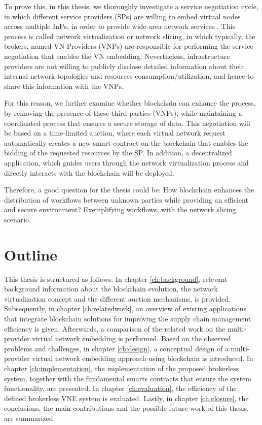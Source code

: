 To prove this, in this thesis, we thoroughly investigate a service negotiation cycle, in which different service providers (SPs) are willing to embed virtual nodes across multiple InPs, in order to provide wide-area network services \cite{dietrich2015multi}. This process is called network virtualization or network slicing, in which typically, the brokers, named VN Providers (VNPs) are responsible for performing the service negotiation that enables the VN embedding. Nevertheless, infrastructure providers are not willing to publicly disclose detailed information about their internal network topologies and resources consumption/utilization, and hence to share this information with the VNPs.

For this reason, we further examine whether blockchain can enhance the process, by removing the presence of these third-parties (VNPs), while maintaining a coordinated process that ensures a secure storage of data. This negotiation will be based on a time-limited auction, where each virtual network request automatically creates a new smart contract on the blockchain that enables the bidding of the requested resources by the SP. In addition, a decentralized application, which guides users through the network virtualization process and directly interacts with the blockchain will be deployed.

Therefore, a good question for the thesis could be: How blockchain enhances the distribution of workflows between unknown parties while providing an efficient and secure environment? Exemplifying workflows, with the network slicing scenario.

\section{Outline}

This thesis is structured as follows. In chapter \ref{ch:background}, relevant background information about the blockchain evolution, the network virtualization concept and the different auction mechanisms, is provided. Subsequently, in chapter \ref{ch:relatedwork}, an overview of existing applications that integrate blockchain solutions for improving the supply chain management efficiency is given. Afterwards, a comparison of the related work on the multi-provider virtual network embedding is performed. Based on the observed problems and challenges, in chapter \ref{ch:design}, a conceptual design of a multi-provider virtual network embedding approach using blockchain is introduced. In chapter \ref{ch:implementation}, the implementation of the proposed brokerless system, together with the fundamental smarts contracts that ensure the system functionality, are presented. In chapter \ref{ch:evaluation}, the efficiency of the defined brokerless VNE system is evaluated. Lastly, in chapter \ref{ch:closure}, the conclusions, the main contributions and the possible future work of this thesis, are summarized.


